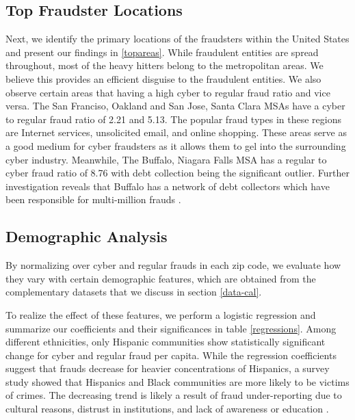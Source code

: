 \documentclass[conference]{IEEEtran}
\begin{document}
\subsection{Top Fraudster Locations}\label{fraudser_locations}
Next, we identify the primary locations of the fraudsters within the United States and present our findings in \ref{topareas}. While fraudulent entities are spread throughout, most of the heavy hitters belong to the metropolitan areas. We believe this provides an efficient disguise to the fraudulent entities. We also observe certain areas that having a high cyber to regular fraud ratio and vice versa. The San Franciso, Oakland and San Jose, Santa Clara MSAs have a cyber to regular fraud ratio of 2.21 and 5.13. The popular fraud types in these regions are Internet services, unsolicited email, and online shopping. These areas serve as a good medium for cyber fraudsters as it allows them to gel into the surrounding cyber industry. Meanwhile, The Buffalo, Niagara Falls MSA has a regular to cyber fraud ratio of 8.76 with debt collection being the significant outlier. Further investigation reveals that Buffalo has a network of debt collectors which have been responsible for multi-million frauds \cite{buffalodebt1, buffalodebt2}.



\subsection{Demographic Analysis}\label{demographic_analysis}


By normalizing over cyber and regular frauds in each zip code, we evaluate how they vary with certain demographic features, which are obtained from the complementary datasets that we discuss in section \ref{data-cal}. 

To realize the effect of these features, we perform a logistic regression and summarize our coefficients and their significances in table \ref{regressions}. Among different ethnicities, only Hispanic communities show statistically significant change for cyber and regular fraud per capita. While the regression coefficients suggest that frauds decrease for heavier concentrations of  Hispanics, a survey study \cite{anderson2013consumer} showed that Hispanics and Black communities are more likely to be victims of crimes. The decreasing trend is likely a result of fraud under-reporting due to cultural reasons, distrust in institutions, and lack of awareness or education \cite{consumerlessons}.
\end{document}
